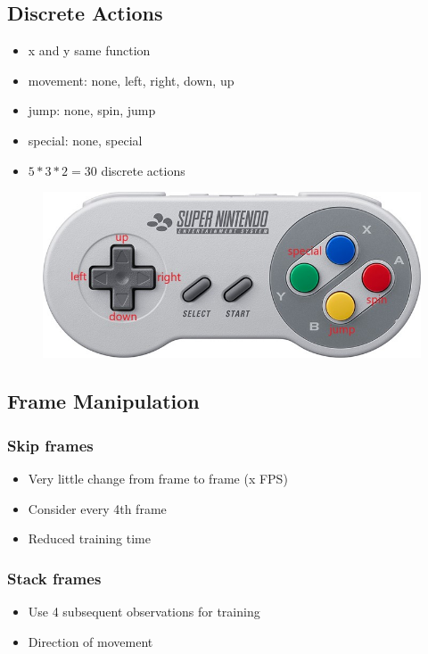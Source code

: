 \documentclass{article}
\begin{document}
    \subsection{Discrete Actions}
    \begin{itemize}
        \item x and y same function
        \item movement: none, left, right, down, up
        \item jump: none, spin, jump
        \item special: none, special
        \item $5*3*2=30$ discrete actions
    \end{itemize}
    \begin{figure}[H]
    \centering
    \includegraphics[width=.85\textwidth]{snes-controller-annot}
    \end{figure}
    \subsection{Frame Manipulation}
    \subsubsection*{Skip frames}
    \begin{itemize}
        \item Very little change from frame to frame (x FPS)
        \item Consider every 4th frame
        \item Reduced training time
    \end{itemize}
    \subsubsection*{Stack frames}
    \begin{itemize}
        \item Use 4 subsequent observations for training
        \item Direction of movement
    \end{itemize}
\end{document}
